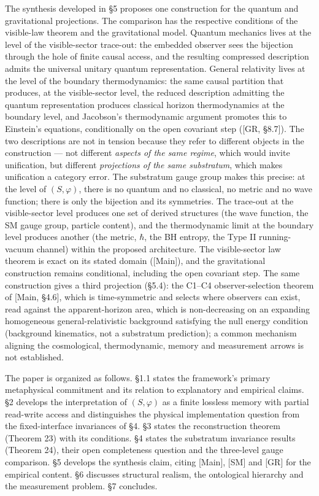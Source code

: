 \documentclass[
]{article}
\begin{document}
The synthesis developed in §5 proposes one construction for the quantum
and gravitational projections. The comparison has the respective
conditions of the visible-law theorem and the gravitational model.
Quantum mechanics lives at the level of the visible-sector trace-out:
the embedded observer sees the bijection through the hole of finite
causal access, and the resulting compressed description admits the
universal unitary quantum representation. General relativity lives at
the level of the boundary thermodynamics: the same causal partition that
produces, at the visible-sector level, the reduced description admitting
the quantum representation produces classical horizon thermodynamics at
the boundary level, and Jacobson's thermodynamic argument promotes this
to Einstein's equations, conditionally on the open covariant step
({[}GR, §8.7{]}). The two descriptions are not in tension because they
refer to different objects in the construction --- not different
\emph{aspects of the same regime}, which would invite unification, but
different \emph{projections of the same substratum}, which makes
unification a category error. The substratum gauge group makes this
precise: at the level of \((S, \varphi)\), there is no quantum and no
classical, no metric and no wave function; there is only the bijection
and its symmetries. The trace-out at the visible-sector level produces
one set of derived structures (the wave function, the SM gauge group,
particle content), and the thermodynamic limit at the boundary level
produces another (the metric, \(\hbar\), the BH entropy, the Type II
running-vacuum channel) within the proposed architecture. The
visible-sector law theorem is exact on its stated domain ({[}Main{]}),
and the gravitational construction remains conditional, including the
open covariant step. The same construction gives a third projection
(§5.4): the C1--C4 observer-selection theorem of {[}Main, §4.6{]}, which
is time-symmetric and selects where observers can exist, read against
the apparent-horizon area, which is non-decreasing on an expanding
homogeneous general-relativistic background satisfying the null energy
condition (background kinematics, not a substratum prediction); a common
mechanism aligning the cosmological, thermodynamic, memory and
measurement arrows is not established.

The paper is organized as follows. §1.1 states the framework's primary
metaphysical commitment and its relation to explanatory and empirical
claims. §2 develops the interpretation of \((S, \varphi)\) as a finite
lossless memory with partial read-write access and distinguishes the
physical implementation question from the fixed-interface invariances of
§4. §3 states the reconstruction theorem (Theorem 23) with its
conditions. §4 states the substratum invariance results (Theorem 24),
their open completeness question and the three-level gauge comparison.
§5 develops the synthesis claim, citing {[}Main{]}, {[}SM{]} and
{[}GR{]} for the empirical content. §6 discusses structural realism, the
ontological hierarchy and the measurement problem. §7 concludes.
\end{document}
